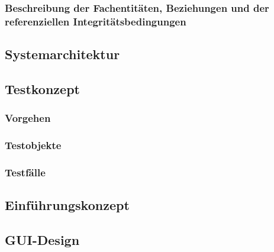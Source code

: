 \subsubsection{Beschreibung der Fachentitäten, Beziehungen und der referenziellen Integritätsbedingungen}
\subsection{Systemarchitektur}
\subsection{Testkonzept}
\subsubsection{Vorgehen}
\subsubsection{Testobjekte}
\subsubsection{Testfälle}
\subsection{Einführungskonzept}
\subsection{GUI-Design}
